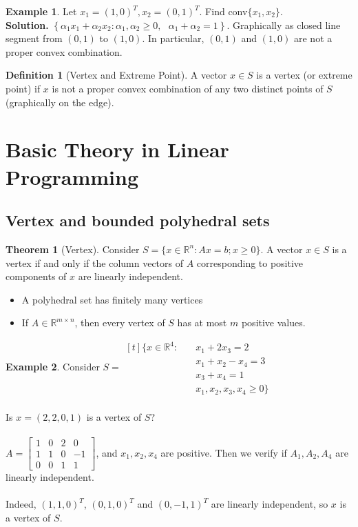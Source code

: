 \documentclass{article}
\theoremstyle{definition}
\newtheorem{theorem}{Theorem}[section]
\newtheorem{definition}{Definition}[section]
\newtheorem{example}{Example}[section]
\begin{document}
	\begin{example}
		Let $x_1 = (1,0)^T, x_2 = (0,1)^T$. Find conv$\{x_1, x_2\}$.\\
		\textbf{Solution.} $\left\{ \alpha_1x_1 + \alpha_2x_2 : \alpha_1, \alpha_2 \geq 0,\text{ }\alpha_1+\alpha_2 = 1\right\}$. Graphically as closed line segment from $(0,1)$ to $(1,0)$. In particular, $(0, 1)$ and $(1, 0)$ are not a proper convex combination.
	\end{example}

	\begin{definition}[Vertex and Extreme Point]\hfill\break
		A vector $x \in S$ is a vertex (or extreme point) if $x$ is not a proper convex combination of any two distinct points of $S$ (graphically on the edge).
	\end{definition}

    \break
	\section{Basic Theory in Linear Programming}
	\subsection{Vertex and bounded polyhedral sets}
	\begin{theorem}[Vertex]\hfill\break
		Consider $S = \{x \in \mathbb{R}^n: Ax = b; x \geq 0\}$. A vector $x \in S$ is a vertex if and only if the column vectors of $A$ corresponding to positive components of $x$ are linearly independent.
		\begin{itemize}
			\item A polyhedral set has finitely many vertices
			\item If $A \in \mathbb{R}^{m\times n}$, then every vertex of $S$ has at most $m$ positive values.
		\end{itemize}
	\end{theorem}

	\begin{example}\hfill\break
		Consider $S =
			\begin{aligned}[t]
				\{x \in \mathbb{R}^4:\quad &x_1+2x_3 = 2\\
				&x_1+x_2-x_4 = 3\\
				&x_3+x_4 =1\\
				&x_1, x_2, x_3, x_4 \geq 0\}
			\end{aligned}$\\\\Is $x = (2, 2, 0, 1)$ is a vertex of $S$?\\\\
		$A = \begin{bmatrix} 1 & 0 & 2 & 0 \\ 1 & 1 & 0 & -1 \\ 0 & 0 & 1 & 1 \end{bmatrix}$, and $x_1, x_2, x_4$ are positive. Then we verify if $A_1, A_2, A_4$ are linearly independent.\\\\Indeed, $(1, 1, 0)^T$, $(0,1,0)^T$ and $(0,-1,1)^T$ are linearly independent, so $x$ is a vertex of $S$.
	\end{example}
\end{document}
